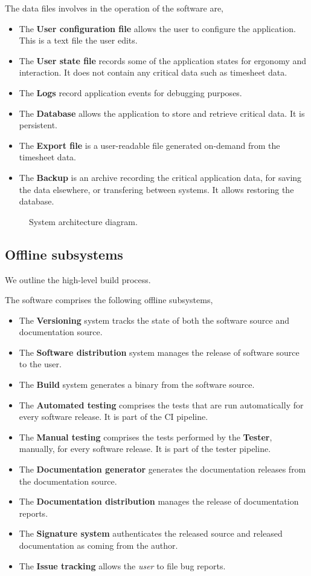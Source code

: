 The data files involves in the operation of the software are,
\begin{itemize}
\item The \textbf{User configuration file} allows the user to configure the
  application. This is a text file the user edits.
\item The \textbf{User state file} records some of the application states
  for ergonomy and interaction. It does not contain any critical data such
  as timesheet data.
\item The \textbf{Logs} record application events for debugging purposes.
\item The \textbf{Database} allows the application to store and retrieve
  critical data. It is persistent.
\item The \textbf{Export file} is a user-readable file generated on-demand
  from the timesheet data.
\item The \textbf{Backup} is an archive recording the critical application
  data, for saving the data elsewhere, or transfering between systems.
  It allows restoring the database.
\end{itemize}

\begin{figure}
  
  \caption{\label{fig:arch-diagram} System architecture diagram.}
\end{figure}

\subsection{Offline subsystems}
We outline the high-level build process.

The software comprises the following offline subsystems,
\begin{itemize}
\item The \textbf{Versioning} system tracks the state of both the software
  source and documentation source.
\item The \textbf{Software distribution} system manages the release of
  software source to the user.
\item The \textbf{Build} system generates a binary from the software source.
\item The \textbf{Automated testing} comprises the tests that are run
  automatically for every software release. It is part of the \gls{CI} pipeline.
\item The \textbf{Manual testing} comprises the tests performed by the
  \textbf{Tester}, manually, for every software release. It is part of the
  tester pipeline.
\item The \textbf{Documentation generator} generates the documentation
  releases from the documentation source.
\item The \textbf{Documentation distribution} manages the release of
  documentation reports.
\item The \textbf{Signature system} authenticates the released source and
  released documentation as coming from the author.
\item The \textbf{Issue tracking} allows the \emph{user} to file bug reports.
\end{itemize}


